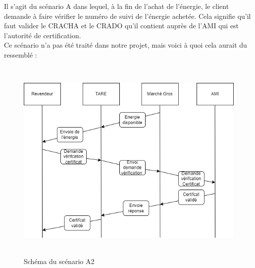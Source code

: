 Il s'agit du scénario A dans lequel, à la fin de l'achat de l'énergie, le client demande à faire vérifier le numéro de suivi de l'énergie achetée. Cela signifie qu'il faut valider le CRACHA et le CRADO qu'il contient auprès de l'AMI qui est l'autorité de certification.
\\[1cm]
 Ce scénario n'a pas été traité dans notre projet, mais voici à quoi cela aurait du ressemblé :
\\
 \begin{figure}[h]
    \centering
    \includegraphics[width=130mm, height=100mm]{images/ScenarioA2.png}
    \caption{Schéma du scénario A2}
    \label{img:mesh22}
\end{figure}
\newpage